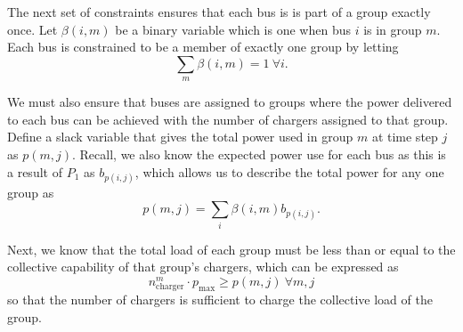 \par The next set of constraints ensures that each bus is is part of a group exactly once. Let $\beta(i,m)$ be a binary variable which is one when bus $i$ is in group $m$. Each bus is constrained to be a member of exactly one group by letting
\begin{equation}\label{eqn:groups:groupId}
	\sum_m\beta(i,m) = 1 \ \forall i.
\end{equation}
      
\par We must also ensure that buses are assigned to groups where the power delivered to each bus can be achieved with the number of chargers assigned to that group. Define a slack variable that gives the total power used in group $m$ at time step $j$ as $p(m,j)$. Recall, we also know the expected power use for each bus as this is a result of $P_1$ as $b_{p(i,j)}$, which allows us to describe the total power for any one group as
\begin{equation}\label{eqn:groups:groupPower}
 p(m,j) = \sum_i\beta(i,m)b_{p(i,j)}.
\end{equation}

\par Next, we know that the total load of each group must be less than or equal to the collective capability of that group's chargers, which can be expressed as
\begin{equation}\label{eqn:groups:chargeLimit}
	n^m_{\text{charger}}\cdot p_{\text{max}} \ge p(m,j) \ \forall m,j
\end{equation}
so that the number of chargers is sufficient to charge the collective load of the group. 

